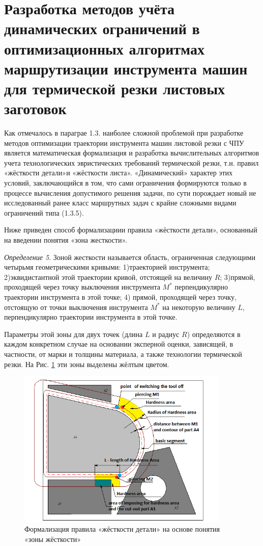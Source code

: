 \documentclass[12pt]{report}
\begin{document}
\section{Разработка методов учёта динамических ограничений
  в оптимизационных алгоритмах маршрутизации инструмента машин для термической резки листовых заготовок}

Как отмечалось в параграе 1.3.
наиболее сложной проблемой при разработке методов оптимизации
траектории инструмента машин листовой резки с ЧПУ
является математическая формализация и
разработка вычислительных алгоритмов учета
технологических эвристических требований термической резки,
т.н. правил «жёсткости детали»и «жёсткости листа».
«Динамический» характер этих условий, заключающийся в том,
что сами ограничения формируются только в процессе вычисления
допустимого решения задачи, по сути порождает
новый не исследованный ранее класс маршрутных задач
с крайне сложными видами ограничений типа (1.3.5).

Ниже приведен способ формализациии правила «жёсткости детали»,
основанный на введении понятия «зона жесткости».

{\it Определение 5}.
Зоной жесткости называется область,
ограниченная следующими четырьмя геометрическими кривыми:
1)траекторией инструмента;
2)эквидистантной этой траектории кривой, отстоящей на величину $R$;
3)прямой, проходящей через точку выключения инструмента $M^*$
перпендикулярно траектории инструмента в этой точке;
4) прямой, проходящей через точку,
отстоящую от точки выключения инструмента $M^*$ на некоторую величину $L$,
перпендикулярно траектории инструмента в этой точке.

Параметры этой зоны для двух точек
(длина $L$ и радиус $R$)
определяются в каждом конкретном случае
на основании эксперной оценки,
зависящей, в частности, от марки и толщины материала,
а также технологии термической резки.
На Рис. \ref{hardness-area}
эти зоны выделены жёлтым цветом.

\begin{figure}
 \begin{center}
  \includegraphics[width=0.9\textwidth]{hardness-area.png}
  \caption{Формализация правила «жёсткости детали» на основе понятия «зоны жёсткости»}
  \label{hardness-area}
  \end{center}
\end{figure}
\end{document}
